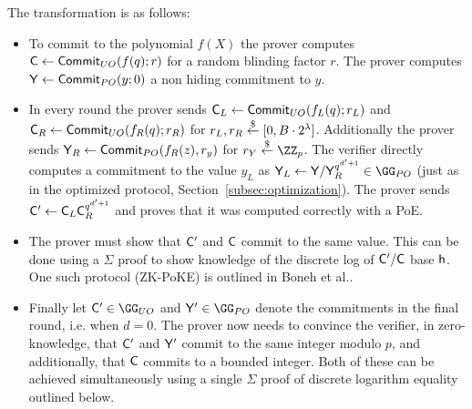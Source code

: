 The transformation is as follows: 

\begin{itemize}
\item To commit to the polynomial $f(X)$ the prover computes $\mathsf{C}\gets \textsf{{Commit}}_{UO}(f(q);r)$ for a random blinding factor $r$. 
The prover computes $\mathsf{Y}\gets \textsf{{Commit}}_{PO}(y;0)$ a non hiding commitment to $y$.

\item In every round the prover sends $\mathsf{C}_L\gets\textsf{{Commit}}_{UO}(f_L(q);r_L)$ and $\mathsf{C}_R\gets\textsf{{Commit}}_{UO}(f_R(q);r_R)$ for $r_L,r_R \overset{\$}{\gets} [0,B\cdot 2^{\lambda}]$. Additionally the prover sends $\mathsf{Y}_R\gets\textsf{{Commit}}_{PO}(f_R(z),r_y)$ for $r_Y\sample \ZZ_p$. 
The verifier directly computes a commitment to the value $y_L$ as $\gr{Y}_L\gets\gr{Y}/\gr{Y}_R^{q^{d'+1}} \in \GG_{PO}$ (just as in the optimized protocol, Section~\ref{subsec:optimization}). The prover sends $\mathsf{C}'\gets \mathsf{C}_L\mathsf{C}_R^{q^{d'+1}}$ and proves that it was computed correctly with a PoE. 

\item The prover must show that $\mathsf{C}'$ and $\mathsf{C}$ commit to the same value. This can be done using a $\Sigma$ proof to show knowledge of the discrete log of $\mathsf{C}' / \mathsf{C}$ base $\mathsf{h}$. One such protocol (ZK-PoKE) is outlined in Boneh et al.\cite{C:BonBunFis19}.
 
\item Finally let $\gr{C}'\in \GG_{UO}$ and $\gr{Y}'\in \GG_{PO}$ denote the commitments in the final round, i.e. when $d=0$. The prover now needs to convince the verifier, in zero-knowledge, that $\mathsf{C}'$ and $\mathsf{Y}'$ commit to the same integer modulo $p$, and additionally, that $\mathsf{C}$ commits to a bounded integer. Both of these can be achieved simultaneously using a single $\Sigma$ proof of discrete logarithm equality outlined below.
\end{itemize}

